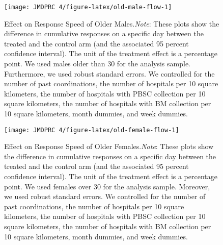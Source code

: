 \documentclass[12pt, a4paper]{article}
\begin{document}
\begin{figure}[H]
\texttt{[image: JMDPRC~4/figure-latex/old-male-flow-1]} \caption{Effect on Response Speed of Older Males.\newline \emph{Note}: These plots show the difference in cumulative responses on a specific day between the treated and the control arm (and the associated 95 percent confidence interval). The unit of the treatment effect is a percentage point. We used males older than 30 for the analysis sample. Furthermore,  we used robust standard errors. We controlled for the number of past coordinations, the number of hospitals per 10 square kilometers, the number of hospitals with PBSC collection per 10 square kilometers, the number of hospitals with BM collection per 10 square kilometers, month dummies, and week dummies.}\label{fig:old-male-flow}
\end{figure}

\begin{figure}[H]
\texttt{[image: JMDPRC~4/figure-latex/old-female-flow-1]} \caption{Effect on Response Speed of Older Females.\newline \emph{Note}: These plots show the difference in cumulative responses on a specific day between the treated and the control arm (and the associated 95 percent confidence interval). The unit of the treatment effect is a percentage point. We used females over 30 for the analysis sample. Moreover, we used robust standard errors. We controlled for the number of past coordinations, the number of hospitals per 10 square kilometers, the number of hospitals with PBSC collection per 10 square kilometers, the number of hospitals with BM collection per 10 square kilometers, month dummies, and week dummies.}\label{fig:old-female-flow}
\end{figure}
\end{document}
